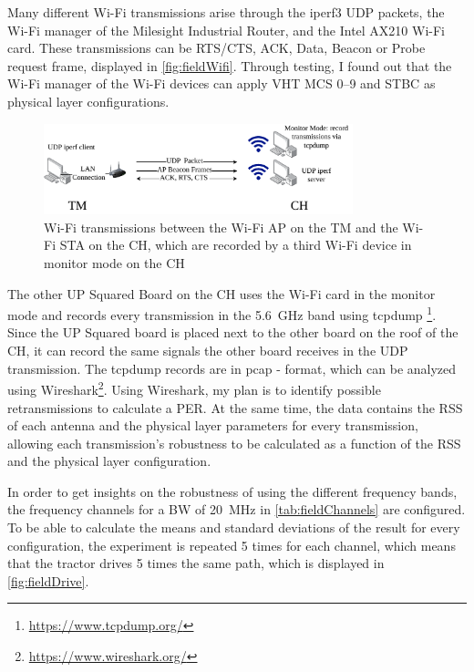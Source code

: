Many different Wi-Fi transmissions arise through the iperf3 \ac{UDP} packets, the Wi-Fi manager of the Milesight Industrial Router, and the Intel AX210 Wi-Fi card.
These transmissions can be RTS/CTS, ACK, Data, Beacon or Probe request frame, displayed in \autoref{fig:fieldWifi}.
Through testing, I found out that the Wi-Fi manager of the Wi-Fi devices can apply VHT \ac{MCS} \numrange{0}{9} and \ac{STBC} as physical layer configurations.

\begin{figure}[H]%
	\centering
	\includegraphics[width=0.8\textwidth]{figures/FieldExperimentwifi}
	\caption{Wi-Fi transmissions between the Wi-Fi \ac{AP} on the \acf{TM} and the Wi-Fi \ac{STA} on the \acf{CH}, which
	are recorded by a third Wi-Fi device in monitor mode on the \ac{CH}}
	\label{fig:fieldWifi}%
\end{figure}

The other UP Squared Board on the \ac{CH} uses the Wi-Fi card in the monitor mode and records every transmission in the \SI{5.6}{\giga\hertz} band using tcpdump \footnote{\url{https://www.tcpdump.org/}}.
Since the UP Squared board is placed next to the other board on the roof of the \ac{CH}, it can record the same signals the other board receives in the \ac{UDP} transmission.
The tcpdump records are in pcap - format, which can be analyzed using Wireshark\footnote{\url{https://www.wireshark.org/}}.
Using Wireshark, my plan is to identify possible retransmissions to calculate a \ac{PER}.
At the same time, the data contains the \ac{RSS} of each antenna and the physical layer parameters for every
transmission, allowing each transmission's robustness to be calculated as a function of the \ac{RSS} and the physical
layer configuration.

In order to get insights on the robustness of using the different frequency bands, the frequency channels for a \ac{BW} of \SI{20}{\mega\hertz} in \autoref{tab:fieldChannels} are configured.
To be able to calculate the means and standard deviations of the result for every configuration, the experiment is repeated \num{5} times for each channel,
which means that the tractor drives \num{5} times the same path, which is displayed in \autoref{fig:fieldDrive}.

